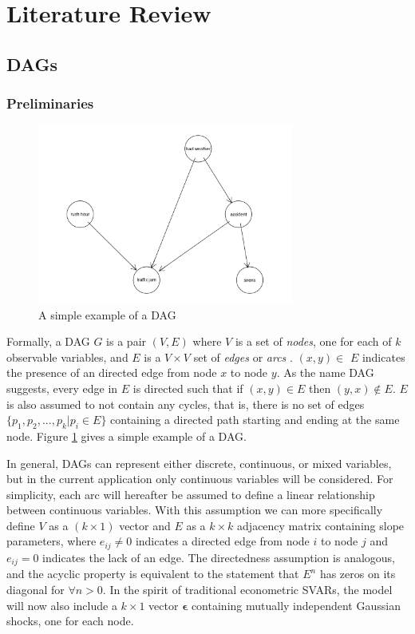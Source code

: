 \documentclass{article}
\begin{document}
\section{Literature Review} \label{lit_review}

\subsection{DAGs} \label{dags}

\subsubsection{Preliminaries} \label{prelim}

\begin{figure}
  \centering
  \includegraphics[width=0.75\textwidth]{images/trafficjam.png}
  \caption{A simple example of a DAG \parencite{traffic_jam}}
  \label{dag1}
\end{figure}

Formally, a DAG $G$ is a pair $(V,E)$ where $V$ is a set of \textit{nodes}, one for each of $k$ observable variables, and $E$ is a $V \times V$ set of \textit{edges} or \textit{arcs} \parencite{kalisch2007estimating}. $(x,y) \in$ $E$ indicates the presence of an directed edge from node $x$ to node $y$. As the name DAG suggests, every edge in $E$ is directed such that if $(x,y) \in E$ then $(y,x) \not \in E$. $E$ is also assumed to not contain any cycles, that is, there is no set of edges $\{p_1, p_2, ..., p_k | p_i \in E\}$ containing a directed path starting and ending at the same node. Figure \ref{dag1} gives a simple example of a DAG.

In general, DAGs can represent either discrete, continuous, or mixed variables, but in the current application only continuous variables will be considered. For simplicity, each arc will hereafter be assumed to define a linear relationship between continuous variables. With this assumption we can more specifically define $V$ as a $(k \times 1)$ vector and $E$ as a $k \times k$ adjacency matrix containing slope parameters, where $e_{ij} \not = 0$ indicates a directed edge from node $i$ to node $j$ and $e_{ij} = 0$ indicates the lack of an edge. The directedness assumption is analogous, and the acyclic property is equivalent to the statement that $E^n$ has zeros on its diagonal for $\forall n > 0$. In the spirit of traditional econometric SVARs, the model will now also include a $k \times 1$ vector $\mathbf{\epsilon}$ containing mutually independent Gaussian shocks, one for each node.
\end{document}
